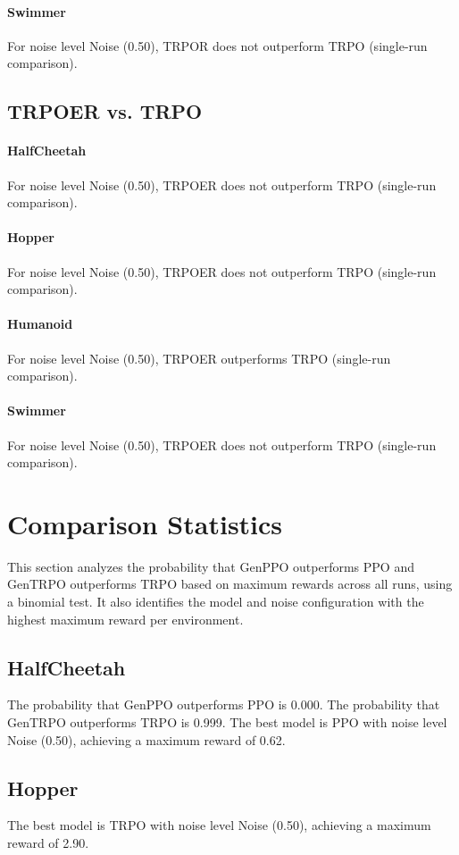 \paragraph{Swimmer}
For noise level Noise (0.50), TRPOR does not outperform TRPO (single-run comparison).
\subsection{TRPOER vs. TRPO}
\paragraph{HalfCheetah}
For noise level Noise (0.50), TRPOER does not outperform TRPO (single-run comparison).
\paragraph{Hopper}
For noise level Noise (0.50), TRPOER does not outperform TRPO (single-run comparison).
\paragraph{Humanoid}
For noise level Noise (0.50), TRPOER outperforms TRPO (single-run comparison).
\paragraph{Swimmer}
For noise level Noise (0.50), TRPOER does not outperform TRPO (single-run comparison).
\section{Comparison Statistics}
This section analyzes the probability that GenPPO outperforms PPO and GenTRPO outperforms TRPO based on maximum rewards across all runs, using a binomial test. It also identifies the model and noise configuration with the highest maximum reward per environment.
\subsection{HalfCheetah}
The probability that GenPPO outperforms PPO is 0.000.
The probability that GenTRPO outperforms TRPO is 0.999.
The best model is PPO with noise level Noise (0.50), achieving a maximum reward of 0.62.
\subsection{Hopper}
The best model is TRPO with noise level Noise (0.50), achieving a maximum reward of 2.90.
